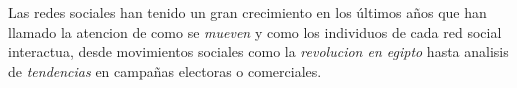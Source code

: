 
Las redes sociales han tenido un gran crecimiento  en
los \'ultimos a\~nos que han llamado la atencion de como se\emph{ mueven} y como los
individuos de cada red social interactua, desde movimientos sociales como la
\emph{revolucion en egipto}  hasta  analisis de
\emph{tendencias} en campa\~nas electoras o comerciales.\\
